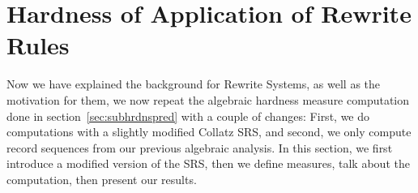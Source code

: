 
\chapter{Hardness of Application of Rewrite Rules} \label{sec:hardnessrewriterules}
Now we have explained the background for Rewrite Systems, as well as the motivation for them, we now repeat the algebraic hardness measure computation done in section~\ref{sec:subhrdnspred} with a couple of changes: First, we do computations with a slightly modified Collatz SRS, and second, we only compute record sequences from our previous algebraic analysis. In this section, we first introduce a modified version of the SRS, then we define measures, talk about the computation, then present our results.

